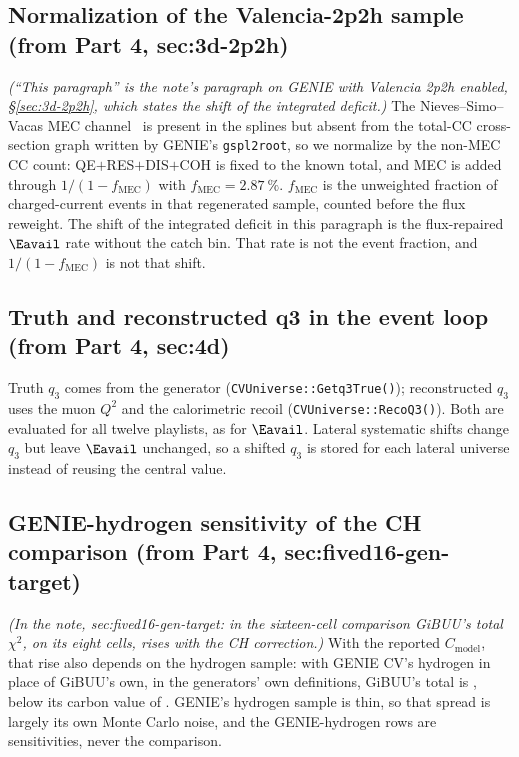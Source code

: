 \subsection{Normalization of the Valencia-2p2h sample (from Part 4, sec:3d-2p2h)}
\noindent\emph{(``This paragraph'' is the note's paragraph on GENIE with Valencia 2p2h enabled, \S\ref{sec:3d-2p2h}, which states the shift of the integrated deficit.)}
The Nieves--Simo--Vacas MEC channel~\cite{Nieves:2011pp,Gran:2013kda} is present in the splines but absent from the total-CC cross-section graph written by GENIE's \texttt{gspl2root}, so we normalize by the non-MEC CC count: QE$+$RES$+$DIS$+$COH is fixed to the known total, and MEC is added through $1/(1-f_{\mathrm{MEC}})$ with $f_{\mathrm{MEC}}=\SI{2.87}{\percent}$. $f_{\mathrm{MEC}}$ is the unweighted fraction of charged-current events in that regenerated sample, counted before the flux reweight. The shift of the integrated deficit in this paragraph is the flux-repaired $\Eavail$ rate without the catch bin. That rate is not the event fraction, and $1/(1-f_{\mathrm{MEC}})$ is not that shift.

\subsection{Truth and reconstructed q3 in the event loop (from Part 4, sec:4d)}
Truth $q_{3}$ comes from the generator (\texttt{CVUniverse::Getq3True()}); reconstructed $q_{3}$ uses the muon $Q^{2}$ and the calorimetric recoil (\texttt{CVUniverse::RecoQ3()}). Both are evaluated for all twelve playlists, as for $\Eavail$. Lateral systematic shifts change $q_{3}$ but leave $\Eavail$ unchanged, so a shifted $q_{3}$ is stored for each lateral universe instead of reusing the central value.

\subsection{GENIE-hydrogen sensitivity of the CH comparison (from Part 4, sec:fived16-gen-target)}
\noindent\emph{(In the note, sec:fived16-gen-target: in the sixteen-cell comparison GiBUU's total $\chi^2$, on its eight cells, rises with the CH correction.)}
 With the reported $C_{\mathrm{model}}$, that rise also depends on the hydrogen sample: with GENIE CV's hydrogen in place of GiBUU's own, in the generators' own definitions, GiBUU's total is , below its carbon value of . GENIE's hydrogen sample is thin, so that spread is largely its own Monte Carlo noise, and the GENIE-hydrogen rows are sensitivities, never the comparison.

